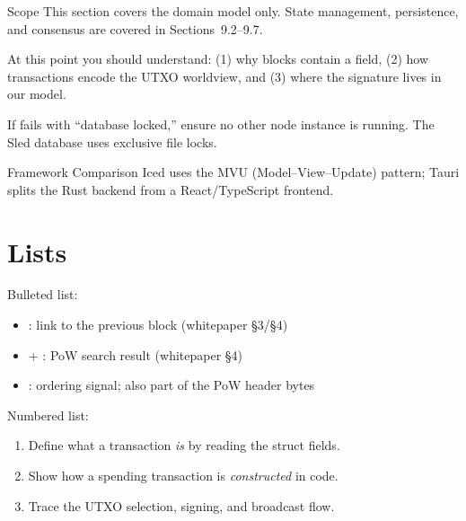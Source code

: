 \begin{infobox}{Scope}
This section covers the domain model only. State management,
persistence, and consensus are covered in Sections~9.2--9.7.
\end{infobox}

\begin{checkpointbox}
At this point you should understand: (1) why blocks contain a
 field, (2) how transactions encode the
UTXO worldview, and (3) where the signature lives in our model.
\end{checkpointbox}

\begin{troublebox}
If  fails with ``database locked,'' ensure no
other node instance is running. The Sled database uses exclusive
file locks.
\end{troublebox}

\begin{examplebox}{Framework Comparison}
Iced uses the MVU (Model--View--Update) pattern; Tauri splits
the Rust backend from a React/TypeScript frontend.
\end{examplebox}

\section{Lists}

Bulleted list:
\begin{itemize}
  \item {}: link to the previous block (whitepaper \S3/\S4)
  \item {} + : PoW search result (whitepaper \S4)
  \item {}: ordering signal; also part of the PoW header bytes
\end{itemize}

Numbered list:
\begin{enumerate}
  \item Define what a transaction \emph{is} by reading the struct fields.
  \item Show how a spending transaction is \emph{constructed} in code.
  \item Trace the UTXO selection, signing, and broadcast flow.
\end{enumerate}

\scenbreak

